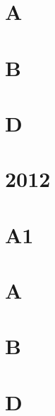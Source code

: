 \documentclass{article}
\begin{document}
\section*{A}
\section*{B}
\section*{D}



\section*{2012}
\section*{A1}
\section*{A}
\section*{B}
\section*{D}
\end{document}
